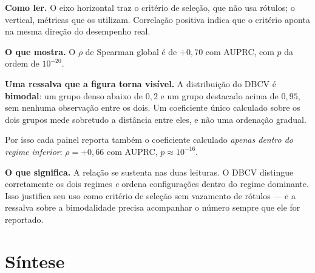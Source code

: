 \documentclass[11pt,a4paper]{article}
\begin{document}
\textbf{Como ler.} O eixo horizontal traz o critério de seleção, que não usa
rótulos; o vertical, métricas que os utilizam. Correlação positiva indica que o
critério aponta na mesma direção do desempenho real.

\textbf{O que mostra.} O $\rho$ de Spearman global é de $+0{,}70$ com AUPRC, com
$p$ da ordem de $10^{-20}$.

\textbf{Uma ressalva que a figura torna visível.} A distribuição do DBCV é
\textbf{bimodal}: um grupo denso abaixo de $0{,}2$ e um grupo destacado acima de
$0{,}95$, sem nenhuma observação entre os dois. Um coeficiente único calculado
sobre os dois grupos mede sobretudo a distância entre eles, e não uma ordenação
gradual.

Por isso cada painel reporta também o coeficiente calculado \emph{apenas dentro
do regime inferior}: $\rho = +0{,}66$ com AUPRC, $p \approx 10^{-16}$.

\textbf{O que significa.} A relação se sustenta nas duas leituras. O DBCV
distingue corretamente os dois regimes \emph{e} ordena configurações dentro do
regime dominante. Isso justifica seu uso como critério de seleção sem vazamento
de rótulos --- e a ressalva sobre a bimodalidade precisa acompanhar o número
sempre que ele for reportado.

\clearpage
\section*{Síntese}
\end{document}
